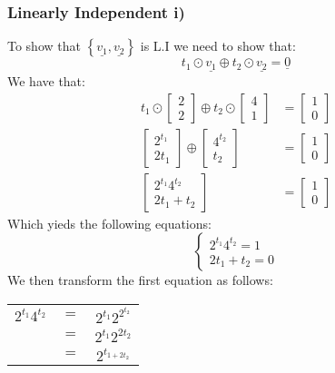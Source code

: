 \documentclass{article}
\begin{document}
\subsubsection*{Linearly Independent i)}
To show that $\left\{ \underline{v_{1}},\underline{v_{2}} \right\}$ is L.I we need to show that: $$t_{1}\odot\underline{v_{1}}\oplus t_{2}\odot \underline{v_2}=\underline{0}$$ We have that:$$\begin{aligned}
   t_{1}\odot\begin{bmatrix} 
      2\\2
      \end{bmatrix}\oplus t_{2}\odot\begin{bmatrix} 
      4\\1
      \end{bmatrix}&=\begin{bmatrix} 
      1\\0
      \end{bmatrix}\\\begin{bmatrix} 
2^{t_{1}}\\
2t_{1}
\end{bmatrix}\oplus\begin{bmatrix} 
4^{t_{2}}\\
t_{2}
\end{bmatrix}&=\begin{bmatrix} 
1\\0
\end{bmatrix}\\
\begin{bmatrix} 
2^{t_{1}}4^{t_{2}}\\
2t_{1}+t_{2}
\end{bmatrix}&=\begin{bmatrix} 
1\\0
\end{bmatrix}
\end{aligned}$$
Which yieds the following equations: $$\begin{cases}
2^{t_{1}}4^{t_{2}}=1\\
2t_{1}+t_{2}=0
\end{cases}$$
We then transform the first equation as follows:
\begin{table}[htp]
\centering
\begin{tabular}{ccc}
  $2^{t_{1}}4^{t_{2}}$ & $=$  &  $2^{t_{1}}2^{2^{t_{2}}}$ \\
   & $=$  & $2^{t_{1}}2^{2t_{2}}$  \\
   & $=$  & $2^{t_{1+2t_{2}}}$  \\
\end{tabular}
\end{table}\\
\end{document}
